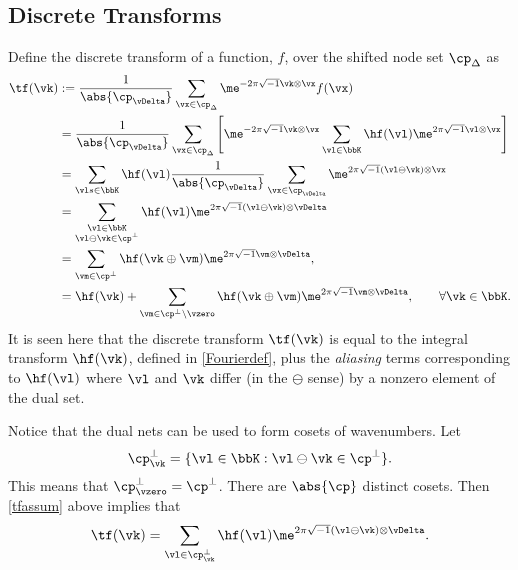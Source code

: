 \documentclass[]{elsarticle}
\begin{document}
\subsection{Discrete Transforms}
Define the discrete transform of a function, $f$, over the shifted node set $\cp_{\Delta}$ as 
\begin{align}
\label{tfdef}
\tf(\vk) 
&:= \frac{1}{\abs{\cp_{\vDelta}}} \sum_{\vx \in \cp_{\Delta}} \me^{-2 \pi \sqrt{-1} \vk \otimes \vx} f(\vx) \\
\nonumber
&= \frac{1}{\abs{\cp_{\vDelta}}} \sum_{\vx \in \cp_{\Delta}} \left[\me^{-2 \pi \sqrt{-1} \vk \otimes \vx}\sum_{\vl \in \bbK} \hf(\vl) \me^{2 \pi \sqrt{-1} \vl \otimes \vx} \right] \\
\nonumber
& = \sum_{\vl  s\in \bbK} \hf(\vl)  \frac{1}{\abs{\cp_{\vDelta}}} \sum_{\vx \in \cp_{\vDelta}}  \me^{2 \pi \sqrt{-1} (\vl \ominus \vk) \otimes \vx} \\
\nonumber
& = \sum_{\substack{\vl \in \bbK \\ \vl \ominus \vk \in \cp^{\perp}}} \hf(\vl) \me^{2 \pi \sqrt{-1} (\vl \ominus \vk) \otimes \vDelta} \\
\nonumber
&= \sum_{\vm \in \cp^{\perp}} \hf(\vk\oplus\vm) \me^{2 \pi \sqrt{-1} \vm \otimes \vDelta}, \\
&= \hf(\vk) + \sum_{\vm \in \cp^{\perp}\setminus \vzero} \hf(\vk\oplus\vm) \me^{2 \pi \sqrt{-1} \vm \otimes \vDelta}, \qquad \forall \vk \in \bbK. \label{tfassum}
\end{align}
It is seen here that the discrete transform $\tf(\vk)$ is equal to the integral transform $\hf(\vk)$, defined in \eqref{Fourierdef}, plus the \emph{aliasing} terms corresponding to $\hf(\vl)$ where $\vl$ and $\vk$ differ (in the $\ominus$ sense) by a nonzero element of the dual set.

Notice that the dual nets can be used to form cosets of wavenumbers.  Let 
\begin{equation*}
\cp^{\perp}_{\vk} = \{ \vl \in \bbK : \vl \ominus \vk \in \cp^{\perp}\}.
\end{equation*}
This means that $\cp^{\perp}_{\vzero}=\cp^{\perp}$.  There are $\abs{\cp}$ distinct cosets.  Then \eqref{tfassum} above implies that 
\begin{equation}
\label{tfassumb}
\tf(\vk) = \sum_{\vl \in \cp^{\perp}_{\vk}} \hf(\vl) \me^{2 \pi \sqrt{-1} (\vl \ominus \vk) \otimes \vDelta}.
\end{equation}
\end{document}
